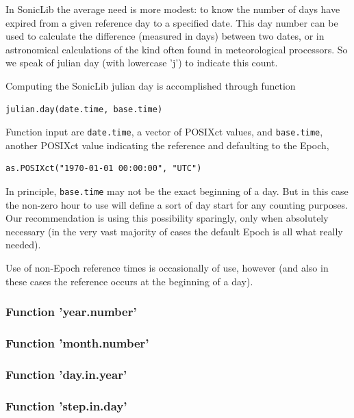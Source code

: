 \documentclass[a4paper,10pt]{book}
\begin{document}
In SonicLib the average need is more modest: to know the number of days have expired from a given reference day to a specified date. This day number can be used to calculate the difference (measured in days) between two dates, or in astronomical calculations of the kind often found in meteorological processors. So we speak of julian day (with lowercase 'j') to indicate this count.

Computing the SonicLib julian day is accomplished through function

\begin{verbatim}
julian.day(date.time, base.time)
\end{verbatim}

Function input are \verb|date.time|, a vector of POSIXct values, and \verb|base.time|, another POSIXct value indicating the reference and defaulting to the Epoch,

\begin{verbatim}
as.POSIXct("1970-01-01 00:00:00", "UTC")
\end{verbatim}

In principle, \verb|base.time| may not be the exact beginning of a day. But in this case the non-zero hour to use will define a sort of day start for any counting purposes. Our recommendation is using this possibility sparingly, only when absolutely necessary (in the very vast majority of cases the default Epoch is all what really needed).

Use of non-Epoch reference times is occasionally of use, however (and also in these cases the reference occurs at the beginning of a day).



\subsubsection{Function 'year.number'}



\subsubsection{Function 'month.number'}

\subsubsection{Function 'day.in.year'}

\subsubsection{Function 'step.in.day'}
\end{document}
